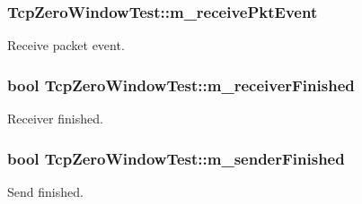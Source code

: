 \subsubsection[{\texorpdfstring{m\+\_\+receive\+Pkt\+Event}{m_receivePktEvent}}]{ Tcp\+Zero\+Window\+Test\+::m\+\_\+receive\+Pkt\+Event\hspace{0.3cm}{\ttfamily [protected]}}\hypertarget{classTcpZeroWindowTest_abe00925a77cf14a65c1c9d77154ac0f6}{}\label{classTcpZeroWindowTest_abe00925a77cf14a65c1c9d77154ac0f6}


Receive packet event. 

\subsubsection[{\texorpdfstring{m\+\_\+receiver\+Finished}{m_receiverFinished}}]{\setlength{\rightskip}{0pt plus 5cm}bool Tcp\+Zero\+Window\+Test\+::m\+\_\+receiver\+Finished\hspace{0.3cm}{\ttfamily [protected]}}\hypertarget{classTcpZeroWindowTest_a66d629347820b9ddc220cf8945a92aea}{}\label{classTcpZeroWindowTest_a66d629347820b9ddc220cf8945a92aea}


Receiver finished. 

\subsubsection[{\texorpdfstring{m\+\_\+sender\+Finished}{m_senderFinished}}]{\setlength{\rightskip}{0pt plus 5cm}bool Tcp\+Zero\+Window\+Test\+::m\+\_\+sender\+Finished\hspace{0.3cm}{\ttfamily [protected]}}\hypertarget{classTcpZeroWindowTest_a580deac0b590a79aae8eae4c5770d789}{}\label{classTcpZeroWindowTest_a580deac0b590a79aae8eae4c5770d789}


Send finished. 

